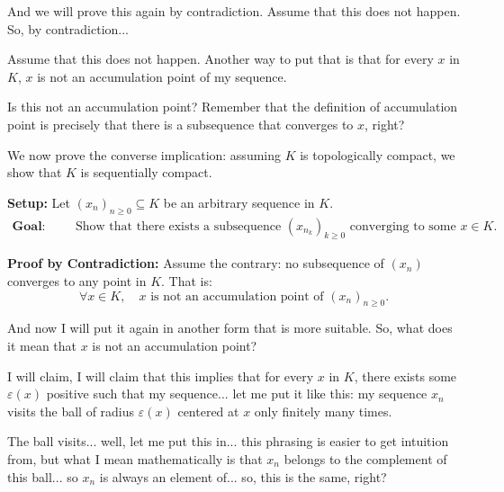 \begin{proofWrapper}
\begin{speech}[00:10:05 - 00:12:05]
And we will prove this again by contradiction. Assume that this does not happen. So, by contradiction... 

Assume that this does not happen. Another way to put that is that for every $x$ in $K$,  $x$ is not an accumulation point of my sequence.

Is this not an accumulation point? Remember that the definition of accumulation point is precisely that there is a subsequence that converges to $x$, right?
\end{speech}

\begin{content}
We now prove the converse implication: assuming $K$ is topologically compact, we show that $K$ is sequentially compact.

\textbf{Setup:}
Let $(x_n)_{n \ge 0} \subseteq K$ be an arbitrary sequence in $K$.
\begin{align*}
\textbf{Goal:} &&& \text{Show that there exists a subsequence } (x_{n_k})_{k \ge 0} \text{ converging to some } x \in K.
\end{align*}

\textbf{Proof by Contradiction:}
Assume the contrary: no subsequence of $(x_n)$ converges to any point in $K$. That is:
\begin{equation}\label{eq:no-accumulation-point}
\forall x \in K, \quad x \text{ is not an accumulation point of } (x_n)_{n \ge 0}.
\end{equation}
\end{content}

\begin{speech}[00:12:05 - 00:14:00]
And now I will put it again in another form that is more suitable. So, what does it mean that $x$ is not an accumulation point?

I will claim,  I will claim that this implies that for every $x$ in $K$,  there exists some $\varepsilon(x)$ positive  such that my sequence... let me put it like this: my sequence $x_n$ visits  the ball of radius $\varepsilon(x)$ centered at $x$ only finitely many times.

The ball visits... well, let me put this in... this phrasing is easier to get intuition from, but what I mean mathematically is that $x_n$ belongs to the complement of this ball... so $x_n$ is always an element of... so, this is the same, right? 


\end{speech}
\end{proofWrapper}
